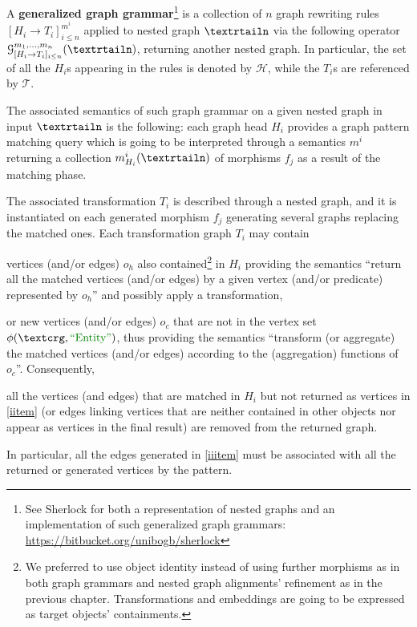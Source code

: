 
\begin{definition}\label{def:gggintro}
A \textbf{generalized graph grammar}\footnote{See Sherlock for both a representation of nested graphs and an implementation of such generalized graph grammars: \url{https://bitbucket.org/unibogb/sherlock}} is a collection of $n$ graph rewriting rules $[H_i\to T_i]_{i\leq n}^{m^i}$ applied to nested graph $\nested$ via the following operator $\mathcal{G}^{m_1,\dots,m_n}_{[H_i\to T_i]_{i\leq n}}(\nested)$, returning another nested graph. In particular, the set of all the $H_i$s appearing in the rules is denoted by $\mathcal{H}$, while the $T_i$s are referenced by $\mathcal{T}$.

The associated semantics of such graph grammar on a given nested graph in input $\nested$ is the following: each graph head $H_i$ provides a graph pattern matching query which is going to be interpreted through a semantics $m^i$ returning a collection $m^i_{H_i}(\nested)$ of morphisms $f_j$ as a result of the matching phase. 

The associated transformation $T_i$ is described through a nested graph, and it is instantiated on each generated morphism $f_j$ generating several graphs replacing the matched ones. Each transformation graph $T_i$ may contain \begin{mylist}
\item \label{iitem} vertices (and/or edges) $o_h$ also contained\footnote{We preferred to use object identity instead of using further morphisms as in both graph grammars and nested graph alignments' refinement as in the previous chapter. Transformations and embeddings are going to be expressed as target objects' containments.} in $H_i$  providing the semantics ``return all the matched vertices (and/or edges) by a given vertex (and/or predicate) represented by $o_h$'' and possibly apply a transformation,
\item \label{iiitem} or new vertices (and/or edges) $o_c$ that are not in the vertex set $\phi(\ngraph,\ONTA)$, thus providing the semantics ``transform (or aggregate) the matched vertices (and/or edges) according to the (aggregation) functions of $o_c$''. Consequently,
\item \label{iiiitem} all the vertices (and edges) that are matched in $H_i$ but not returned as vertices in \ref{iitem}  (or  edges linking vertices that are neither contained in other objects nor appear as vertices in the final result) are removed from the returned graph.
	\end{mylist} In particular, all the edges generated in \ref{iiitem} must be associated with all the returned or generated vertices by the pattern.
\end{definition}

